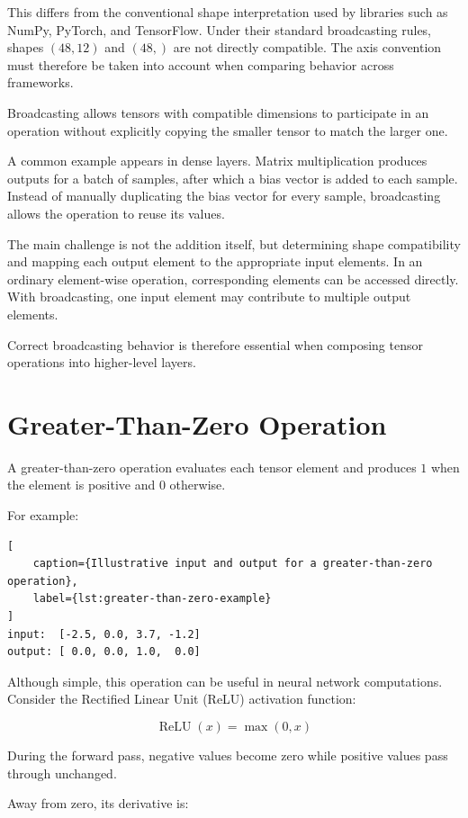 This differs from the conventional shape interpretation used by libraries such as NumPy, PyTorch, and TensorFlow. Under their standard broadcasting rules, shapes \((48,12)\) and \((48,)\) are not directly compatible. The axis convention must therefore be taken into account when comparing behavior across frameworks.

Broadcasting allows tensors with compatible dimensions to participate in an operation without explicitly copying the smaller tensor to match the larger one.

A common example appears in dense layers. Matrix multiplication produces outputs for a batch of samples, after which a bias vector is added to each sample. Instead of manually duplicating the bias vector for every sample, broadcasting allows the operation to reuse its values.

The main challenge is not the addition itself, but determining shape compatibility and mapping each output element to the appropriate input elements. In an ordinary element-wise operation, corresponding elements can be accessed directly. With broadcasting, one input element may contribute to multiple output elements.

Correct broadcasting behavior is therefore essential when composing tensor operations into higher-level layers.

\section{Greater-Than-Zero Operation}

A greater-than-zero operation evaluates each tensor element and produces \(1\) when the element is positive and \(0\) otherwise.

For example:

\begin{lstlisting}[
    caption={Illustrative input and output for a greater-than-zero operation},
    label={lst:greater-than-zero-example}
]
input:  [-2.5, 0.0, 3.7, -1.2]
output: [ 0.0, 0.0, 1.0,  0.0]
\end{lstlisting}

Although simple, this operation can be useful in neural network computations. Consider the Rectified Linear Unit (ReLU) activation function:

\[
\operatorname{ReLU}(x) = \max(0,x)
\]

During the forward pass, negative values become zero while positive values pass through unchanged.

Away from zero, its derivative is:

